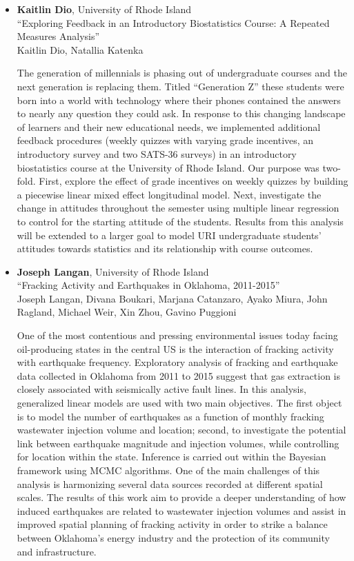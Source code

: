 \begin{itemize}
\pagebreak

\item \textbf{Kaitlin Dio}, University of Rhode Island \\
``Exploring Feedback in an Introductory Biostatistics Course: A Repeated Measures Analysis'' \\
Kaitlin Dio, Natallia Katenka


The generation of millennials is phasing out of undergraduate courses and the next generation is replacing them. Titled “Generation Z” these students were born into a world with technology where their phones contained the answers to nearly any question they could ask. In response to this changing landscape of learners and their new educational needs, we implemented additional feedback procedures (weekly quizzes with varying grade incentives, an introductory survey and two SATS-36 surveys) in an introductory biostatistics course at the University of Rhode Island. Our purpose was two-fold. First, explore the effect of grade incentives on weekly quizzes by building a piecewise linear mixed effect longitudinal model. Next, investigate the change in attitudes throughout the semester using multiple linear regression to control for the starting attitude of the students. Results from this analysis will be extended to a larger goal to model URI undergraduate students’ attitudes towards statistics and its relationship with course outcomes. 

\item \textbf{Joseph Langan}, University of Rhode Island \\
``Fracking Activity and Earthquakes in Oklahoma, 2011-2015'' \\
Joseph Langan, Divana Boukari, Marjana Catanzaro, Ayako Miura, John Ragland, Michael Weir, Xin Zhou, Gavino Puggioni


One of the most contentious and pressing environmental issues today facing oil-producing states in the central US is the interaction of fracking activity with earthquake frequency. Exploratory analysis of fracking and earthquake data collected in Oklahoma from 2011 to 2015 suggest that gas extraction is closely associated with seismically active fault lines. In this analysis, generalized linear models are used with two main objectives. The first object is to model the number of earthquakes as a function of monthly fracking wastewater injection volume and location; second, to investigate the potential link between earthquake magnitude and injection volumes, while controlling for location within the state. Inference is carried out within the Bayesian framework using MCMC algorithms. One of the main challenges of this analysis is harmonizing several data sources recorded at different spatial scales. The results of this work aim to provide a deeper understanding of how induced earthquakes are related to wastewater injection volumes and assist in improved spatial planning of fracking activity in order to strike a balance between Oklahoma's energy industry and the protection of its community and infrastructure.


\end{itemize}
